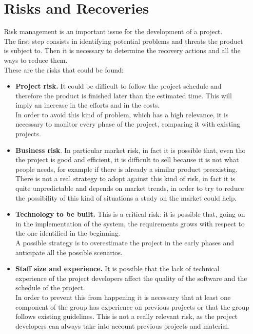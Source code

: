 \newpage
\section{Risks and Recoveries}
	Risk management is an important issue for the development of a project. \\ The first step consists in identifying potential problems and threats the product is subject to. Then it is necessary to determine the recovery actions and all the ways to reduce them.\\ These are the risks that could be found:
	\begin{itemize}
		\item \textbf{Project risk.} It could be difficult to follow the project schedule and therefore the product is finished later than the estimated time. This will imply an increase in the efforts and in the costs.\\ In order to avoid this kind of problem, which has a high relevance, it is necessary to monitor every phase of the project, comparing it with existing projects.
		\item \textbf{Business risk}. In particular market risk, in fact it is possible that, even tho the project is good and efficient, it is difficult to sell because it is not what people needs, for example if there is already a similar product preexisting.\\ There is not a real strategy to adopt against this kind of risk, in fact it is quite unpredictable and depends on market trends, in order to try to reduce the possibility of this kind of situations a study on the market could help.
		\item \textbf{Technology to be built.} This is a critical risk: it is possible that, going on in the implementation of the system, the requirements grows with respect to the one identified in the beginning. \\ A possible strategy is to overestimate the project in the early phases and anticipate all the possible scenarios.
		\item \textbf{Staff size and experience.} It is possible that the lack of technical experience of the project developers affect the quality of the software and the schedule of the project.\\ In order to prevent this from happening it is necessary that at least one component of the group has experience on previous projects or that the group follows existing guidelines. This is not a really relevant risk, as the project developers can always take into account previous projects and material.
	\end{itemize}
